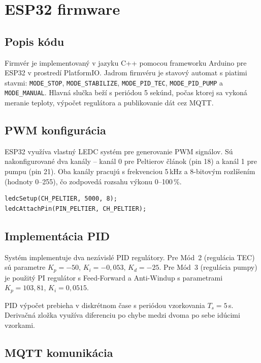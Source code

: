 \section{ESP32 firmware}

\subsection{Popis kódu}

Firmvér je implementovaný v jazyku C++ pomocou frameworku Arduino pre ESP32 v prostredí PlatformIO. Jadrom firmvéru je stavový automat s piatimi stavmi: \texttt{MODE\_STOP}, \texttt{MODE\_STABILIZE}, \texttt{MODE\_PID\_TEC}, \texttt{MODE\_PID\_PUMP} a \texttt{MODE\_MANUAL}. Hlavná slučka beží s periódou 5 sekúnd, počas ktorej sa vykoná meranie teploty, výpočet regulátora a publikovanie dát cez MQTT.

\subsection{PWM konfigurácia}

ESP32 využíva vlastný LEDC systém pre generovanie PWM signálov. Sú nakonfigurované dva kanály -- kanál 0 pre Peltierov článok (pin 18) a kanál 1 pre pumpu (pin 21). Oba kanály pracujú s frekvenciou 5\,kHz a 8-bitovým rozlíšením (hodnoty 0--255), čo zodpovedá rozsahu výkonu 0--100\,\%.

\begin{verbatim}
ledcSetup(CH_PELTIER, 5000, 8);
ledcAttachPin(PIN_PELTIER, CH_PELTIER);
\end{verbatim}

\subsection{Implementácia PID}

Systém implementuje dva nezávislé PID regulátory. Pre Mód~2 (regulácia TEC) sú parametre $K_p = -50$, $K_i = -0{,}053$, $K_d = -25$. Pre Mód~3 (regulácia pumpy) je použitý PI regulátor s Feed-Forward a Anti-Windup s parametrami $K_p = 103{,}81$, $K_i = 0{,}0515$.

PID výpočet prebieha v diskrétnom čase s periódou vzorkovania $T_s = 5$\,s. Derivačná zložka využíva diferenciu po chybe medzi dvoma po sebe idúcimi vzorkami.

\subsection{MQTT komunikácia}

